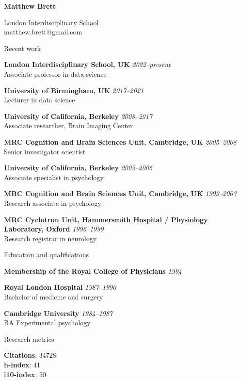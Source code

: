 \documentclass[11pt]{cv}
\newcommand{\PlaceDate}[2]{{\bf #1} \hfill {\em #2} \\}
\newcommand{\PlaceDateNote}[3]{{\bf #1} \hfill {\em #2} \\#3}
\newcommand{\LIS}{London Interdisciplinary School, UK}
\newcommand{\UoB}{University of Birmingham, UK}
\newcommand{\UCB}{University of California, Berkeley}
\newcommand{\CBU}{MRC Cognition and Brain Sciences Unit, Cambridge, UK}
\begin{document}
{\huge \bf Matthew Brett}

London Interdisciplinary School \\
matthew.brett@gmail.com

\begin{cvSection}{Recent work}

\PlaceDateNote{\LIS}{2022--present }{
    Associate professor in data science}

\PlaceDateNote{\UoB}{2017--2021 }{
    Lecturer in data science}

\PlaceDateNote{\UCB}{2008--2017 }{
    Associate researcher, Brain Imaging Center}

\PlaceDateNote{\CBU}{2005--2008}{
    Senior investigator scientist}

\PlaceDateNote{\UCB}{2003--2005 }{
    Associate specialist in psychology}

\PlaceDateNote{\CBU}{1999--2003 }{
    Research associate in psychology}

\PlaceDateNote{
MRC Cyclotron Unit, Hammersmith Hospital / Physiology Laboratory, Oxford}
{1996--1999}
    {Research registrar in neurology}

\end{cvSection}

\begin{cvSection}{Education and qualifications}

{\bf Membership of the Royal College of Physicians} \hfill {\em 1994}

\PlaceDate{Royal London Hospital}{1987--1990 }
Bachelor of medicine and surgery

\PlaceDateNote{Cambridge University}{1984--1987 }{
BA Experimental psychology}

\end{cvSection}

\begin{cvSection}{Research metrics}

{\bf Citations}: 34728 \\
{\bf h-index}: 41 \\
{\bf i10-index}: 50

\end{cvSection}
\end{document}
